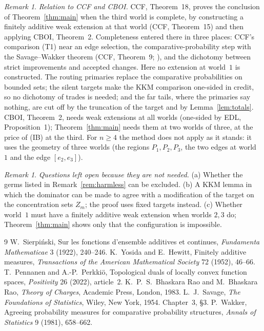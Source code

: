 \documentclass[11pt]{article}
\theoremstyle{definition}\newtheorem{definition}[theorem]{Definition}
\theoremstyle{remark}\newtheorem{remark}[theorem]{Remark}
\begin{document}
\begin{remark}\label{rem:relation}
\emph{Relation to CCF and CBOI.} CCF, Theorem~18, proves the conclusion of
Theorem~\ref{thm:main} when the third world is complete, by constructing a
finitely additive weak extension at that world (CCF, Theorem~15) and then
applying CBOI, Theorem~2. Completeness entered there in three places: CCF's
comparison (T1) near an edge selection, the comparative-probability step with
the Savage--Wakker theorem (CCF, Theorem~9; \cite{Savage,Wakker}), and the dichotomy between strict improvements and accepted
changes. Here no extension at world~$1$ is constructed. The routing primaries
replace the comparative probabilities on bounded sets; the silent targets
make the KKM comparison one-sided in credit, so no dichotomy of trades is
needed; and the far tails, where the primaries say nothing, are cut off by
the truncation of the target and by Lemma~\ref{lem:totals}. CBOI, Theorem~2,
needs weak extensions at all worlds (one-sided by EDL, Proposition~1);
Theorem~\ref{thm:main} needs them at two worlds of three, at the price of
(IB) at the third. For $n\ge4$ the method does not apply as it stands: it
uses the geometry of three worlds (the regions $P_1,P_2,P_3$, the two edges
at world~$1$ and the edge $[e_2,e_3]$).
\end{remark}

\begin{remark}\label{rem:notneeded}
\emph{Questions left open because they are not needed.} (a) Whether the
germs listed in Remark~\ref{rem:harmless} can be excluded. (b) A KKM lemma in
which the dominator can be made to agree with a modification of the target
on the concentration sets $Z_m$; the proof uses fixed targets instead. (c)
Whether world~$1$ must have a finitely additive weak extension when worlds
$2,3$ do; Theorem~\ref{thm:main} shows only that the configuration is
impossible.
\end{remark}

\begin{thebibliography}{9}
 W.~Sierpi\'nski, Sur les fonctions d'ensemble additives et
continues, \emph{Fundamenta Mathematicae} 3 (1922), 240--246.
 K.~Yosida and E.~Hewitt, Finitely additive measures,
\emph{Transactions of the American Mathematical Society} 72 (1952), 46--66.
 T.~Pennanen and A.-P.~Perkki\"o, Topological duals of locally
convex function spaces, \emph{Positivity} 26 (2022), article~2.
 K.~P.~S.~Bhaskara Rao and M.~Bhaskara Rao, \emph{Theory of
Charges}, Academic Press, London, 1983.
 L.~J.~Savage, \emph{The Foundations of Statistics},
Wiley, New York, 1954. Chapter~3, \S3.
 P.~Wakker, Agreeing probability measures for
comparative probability structures, \emph{Annals of Statistics} 9 (1981),
658--662.
\end{thebibliography}
\end{document}

